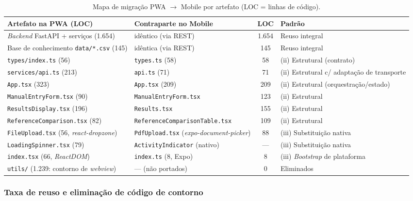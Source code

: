 \begin{table}[H]
\centering
\caption{Mapa de migração PWA $\rightarrow$ Mobile por artefato (LOC = linhas de código).}
\label{tab:mapa_migracao}
\scriptsize
\setlength{\tabcolsep}{3pt}
\begin{tabular}{|p{4.2cm}|p{4.4cm}|c|p{2.7cm}|}
\hline
\textbf{Artefato na PWA (LOC)} & \textbf{Contraparte no Mobile} & \textbf{LOC} & \textbf{Padrão} \\ \hline
\emph{Backend} FastAPI + serviços (1.654) & idêntico (via REST) & 1.654 & Reuso integral \\ \hline
Base de conhecimento \texttt{data/*.csv} (145) & idêntica (via REST) & 145 & Reuso integral \\ \hline
\texttt{types/index.ts} (56) & \texttt{types.ts} (58) & 58 & (ii) Estrutural (contrato) \\ \hline
\texttt{services/api.ts} (213) & \texttt{api.ts} (71) & 71 & (ii) Estrutural c/ adaptação de transporte \\ \hline
\texttt{App.tsx} (323) & \texttt{App.tsx} (209) & 209 & (ii) Estrutural (orquestração/estado) \\ \hline
\texttt{ManualEntryForm.tsx} (90) & \texttt{ManualEntryForm.tsx} & 123 & (ii) Estrutural \\ \hline
\texttt{ResultsDisplay.tsx} (196) & \texttt{Results.tsx} & 155 & (ii) Estrutural \\ \hline
\texttt{ReferenceComparison.tsx} (82) & \texttt{ReferenceComparisonTable.tsx} & 109 & (ii) Estrutural \\ \hline
\texttt{FileUpload.tsx} (56, \emph{react-dropzone}) & \texttt{PdfUpload.tsx} (\emph{expo-document-picker}) & 88 & (iii) Substituição nativa \\ \hline
\texttt{LoadingSpinner.tsx} (79) & \texttt{ActivityIndicator} (nativo) & --- & (iii) Substituição nativa \\ \hline
\texttt{index.tsx} (66, \emph{ReactDOM}) & \texttt{index.ts} (8, Expo) & 8 & (iii) \emph{Bootstrap} de plataforma \\ \hline
\texttt{utils/} (1.239: contorno de \emph{webview}) & --- (não portados) & 0 & Eliminados \\ \hline
\end{tabular}
\end{table}

\subsubsection{Taxa de reuso e eliminação de código de contorno}


